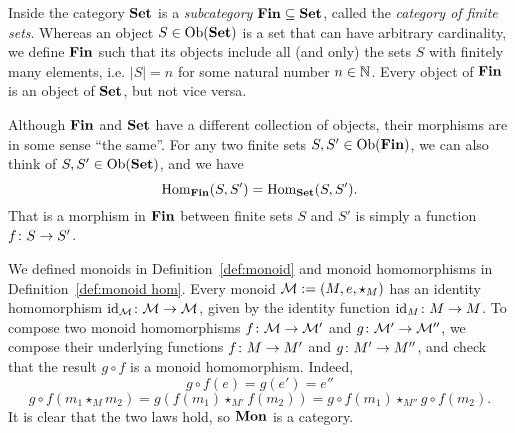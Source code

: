 \documentclass[CT4S-EN-RU]{subfiles}
\begin{document}
\begin{exampleRUS}
\end{exampleRUS}

\begin{exampleENG}\label{ex:Fin}
Inside the category ${\mathbf{Set}}$ is a {\em subcategory} ${\mathbf{Fin}}\subseteq{\mathbf{Set}}$, called the {\em category of finite sets}. Whereas an object $S\in\textnormal{Ob}({\mathbf{Set}})$ is a set that can have arbitrary cardinality, we define ${\mathbf{Fin}}$ such that its objects include all (and only) the sets $S$ with finitely many elements, i.e. $|S|=n$ for some natural number $n\in{\mathbb N}$. Every object of ${\mathbf{Fin}}$ is an object of ${\mathbf{Set}}$, but not vice versa.

Although ${\mathbf{Fin}}$ and ${\mathbf{Set}}$ have a different collection of objects, their morphisms are in some sense “the same”. For any two finite sets $S,S'\in\textnormal{Ob}({\mathbf{Fin}})$, we can also think of $S,S'\in\textnormal{Ob}({\mathbf{Set}})$, and we have
$$\textnormal{Hom}_{\mathbf{Fin}}(S,S')=\textnormal{Hom}_{\mathbf{Set}}(S,S').$$
That is a morphism in ${\mathbf{Fin}}$ between finite sets $S$ and $S'$ is simply a function $f\colon S\rightarrow S'$.
\end{exampleENG}

\begin{exampleRUS}\label{ex:Fin}
\end{exampleRUS}

\begin{exampleENG}\label{ex:mon is cat}
We defined monoids in Definition~\ref{def:monoid} and monoid homomorphisms in Definition~\ref{def:monoid hom}. Every monoid $\mathcal{M}:=(M,e,\star_M)$ has an identity homomorphism $\textnormal{id}_\mathcal{M}\colon\mathcal{M}\rightarrow\mathcal{M}$, given by the identity function $\textnormal{id}_M\colon M\rightarrow M$. To compose two monoid homomorphisms $f\colon\mathcal{M}\rightarrow\mathcal{M}'$ and $g\colon\mathcal{M}'\rightarrow\mathcal{M}''$, we compose their underlying functions $f\colon M\rightarrow M'$ and $g\colon M'\rightarrow M''$, and check that the result $g\circ f$ is a monoid homomorphism. Indeed,
$$g\circ f(e)=g(e')=e''$$
$$g\circ f(m_1\star_Mm_2)=g(f(m_1)\star_{M'}f(m_2))=g\circ f(m_1)\star_{M''}g\circ f(m_2).$$
It is clear that the two laws hold, so ${\mathbf{Mon}}$ is a category.
\end{exampleENG}

\begin{exampleRUS}\label{ex:mon is cat}
\end{exampleRUS}
\end{document}
